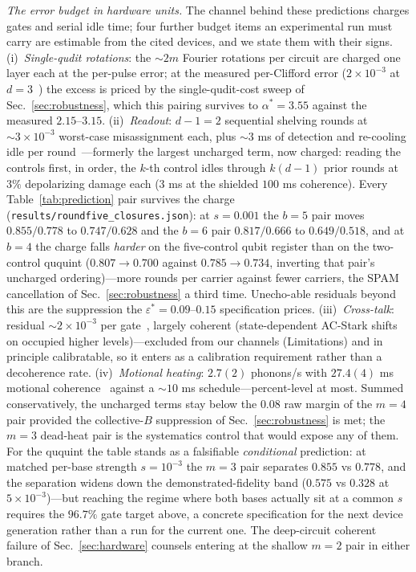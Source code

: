 \documentclass[aps,pra,reprint,superscriptaddress,nofootinbib,floatfix]{revtex4-2}
\begin{document}
\emph{The error budget in hardware units.} The channel behind these
predictions charges gates and serial idle time; four further budget
items an experimental run must carry are estimable from the cited
devices, and we state them with their signs. (i)~\emph{Single-qudit
rotations}: the ${\sim}2m$ Fourier rotations per circuit are charged
one layer each at the per-pulse error; at the measured per-Clifford
error ($2\times10^{-3}$ at $d{=}3$~\cite{ringbauer2022}) the excess
is priced by the single-qudit-cost sweep of Sec.~\ref{sec:robustness},
which this pairing survives to $\alpha^\ast=3.55$ against the measured
$2.15$--$3.15$. (ii)~\emph{Readout}: $d{-}1=2$ sequential shelving
rounds at ${\sim}3\times10^{-3}$ worst-case misassignment each, plus
${\sim}3$ ms of detection and re-cooling idle per
round~\cite{ringbauer2022}---formerly the largest uncharged term,
now charged: reading the controls first, in order, the $k$-th
control idles through $k(d{-}1)$ prior rounds at $3\%$ depolarizing
damage each ($3$ ms at the shielded $100$ ms coherence). Every
Table~\ref{tab:prediction} pair survives the charge
(\texttt{results/roundfive\_closures.json}): at $s=0.001$ the
$b=5$ pair moves $0.855/0.778$ to $0.747/0.628$ and the $b=6$ pair
$0.817/0.666$ to $0.649/0.518$, and at $b=4$ the charge falls
\emph{harder} on the five-control qubit register than on the
two-control ququint ($0.807\to0.700$ against $0.785\to0.734$,
inverting that pair's uncharged ordering)---more rounds per carrier
against fewer carriers, the SPAM cancellation of
Sec.~\ref{sec:robustness} a third time. Unecho-able residuals
beyond this are the suppression the
$\varepsilon^\ast=0.09$--$0.15$ specification prices. (iii)~\emph{Cross-talk}:
residual ${\sim}2\times10^{-3}$ per gate~\cite{ringbauer2022}, largely
coherent (state-dependent AC-Stark shifts on occupied higher
levels)---excluded from our channels (Limitations) and in principle
calibratable, so it enters as a calibration requirement rather than a
decoherence rate. (iv)~\emph{Motional heating}: $2.7(2)$ phonons/s
with $27.4(4)$ ms motional coherence~\cite{meth2025} against a
${\sim}10$ ms schedule---percent-level at most. Summed conservatively,
the uncharged terms stay below the $0.08$ raw margin of the $m{=}4$
pair provided the collective-$B$ suppression of
Sec.~\ref{sec:robustness} is met; the $m{=}3$ dead-heat pair is the
systematics control that would expose any of them. For the ququint the table stands as a
falsifiable \emph{conditional} prediction: at matched per-base
strength $s=10^{-3}$ the $m=3$ pair separates $0.855$ vs $0.778$,
and the separation widens down the demonstrated-fidelity band
($0.575$ vs $0.328$ at $5\times10^{-3}$)---but reaching the regime
where both bases actually sit at a common $s$ requires the
$96.7\%$ gate target above, a concrete specification for the next
device generation rather than a run for the current one. The
deep-circuit coherent failure of Sec.~\ref{sec:hardware} counsels
entering at the shallow $m=2$ pair in either branch.
\end{document}
